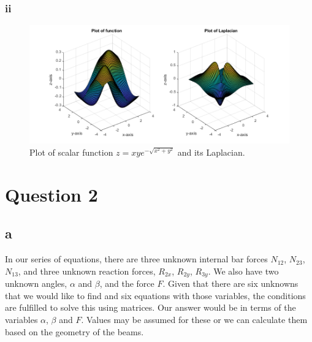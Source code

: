 \documentclass[11pt]{article}
\numberwithin{equation}{section}
\begin{document}
\subsubsection{ii}
\begin{figure}[H]
    \centering
    \includegraphics[width = \textwidth]{./img/q1hii.png}
    \caption{Plot of scalar function $z = xye^{-\sqrt{x^2 + y^2}}$ and its Laplacian.}
\end{figure}

\section{Question 2}
\subsection{a}
In our series of equations, there are three unknown internal bar forces $N_{12}$, $N_{23}$, $N_{13}$, and three unknown reaction forces, $R_{2x}$, $R_{2y}$, $R_{3y}$. We also have two unknown angles, $\alpha$ and $\beta$, and the force $F$. Given that there are six unknowns that we would like to find and six equations with those variables, the conditions are fulfilled to solve this using matrices. Our answer would be in terms of the variables $\alpha$, $\beta$ and $F$. Values may be assumed for these or we can calculate them based on the geometry of the beams. 
\end{document}
